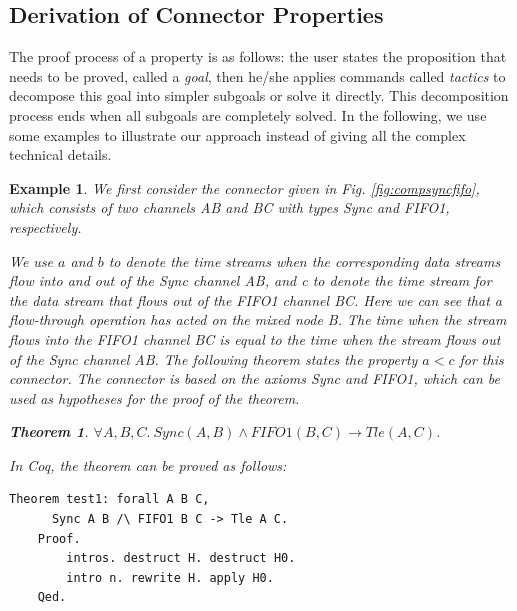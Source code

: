 \documentclass[3p,times]{elsarticle}
\newtheorem{example}{Example}[section]
\newtheorem{theorem}{Theorem}[section]
\begin{document}
\subsection{Derivation of Connector Properties}
The proof process of a property is as follows: the user states the proposition that needs to be proved, called a \emph{goal},
then he/she applies commands called \emph{tactics} to decompose this goal into simpler subgoals or solve it directly. This decomposition
process ends when all subgoals are completely solved. In the following, we use some examples to illustrate our approach instead of
giving all the complex technical details.
\begin{example}
We first consider the connector given in Fig. \ref{fig:compsyncfifo}, which consists of two channels \emph{AB} and \emph{BC} with types Sync and FIFO1, respectively.

We use $a$ and $b$ to denote the time streams when the corresponding data streams flow into and out of the Sync channel \emph{AB}, and
\emph{c} to denote the time stream for the data stream that flows out of the FIFO1 channel \emph{BC}. Here we can see that a flow-through
operation has acted on the mixed node \emph{B}. The time when the stream flows into the FIFO1 channel \emph{BC} is equal to the time when the
stream flows out of the Sync channel \emph{AB}. The following theorem states the property $a < c$ for this connector. The connector is based on the
axioms Sync and FIFO1, which can be used as hypotheses for the proof of the theorem.
\begin{theorem}\label{the:tleac}
$\forall A,B,C.\:Sync(A,B)\land FIFO1(B,C) \rightarrow Tle(A,C)$.
\end{theorem}

In Coq, the theorem can be proved as follows:
\begin{lstlisting}[language=coq]
    Theorem test1: forall A B C,
      Sync A B /\ FIFO1 B C -> Tle A C.
    Proof.
        intros. destruct H. destruct H0.
        intro n. rewrite H. apply H0.
    Qed.
\end{lstlisting}


\end{example}
\end{document}
